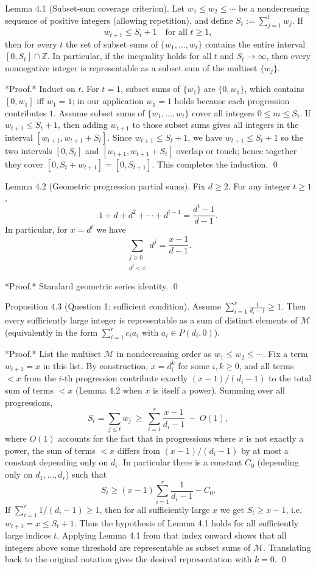 Lemma 4.1 (Subset-sum coverage criterion).
Let $w_1\le w_2\le\cdots$ be a nondecreasing sequence of positive integers (allowing repetition), and define
$S_t:=\sum_{j=1}^t w_j$.
If
\[
 w_{t+1} \le S_t+1\quad\text{for all }t\ge 1,
\]
then for every $t$ the set of subset sums of $\{w_1,\dots,w_t\}$ contains the entire interval $[0,S_t]\cap\mathbb{Z}$.
In particular, if the inequality holds for all $t$ and $S_t\to\infty$, then every nonnegative integer is representable as a subset sum of the multiset $\{w_j\}$.

*Proof.* Induct on $t$.
For $t=1$, subset sums of $\{w_1\}$ are $\{0,w_1\}$, which contains $[0,w_1]$ iff $w_1=1$; in our application $w_1=1$ holds because each progression contributes $1$.
Assume subset sums of $\{w_1,\dots,w_t\}$ cover all integers $0\le m\le S_t$.
If $w_{t+1}\le S_t+1$, then adding $w_{t+1}$ to those subset sums gives all integers in the interval $[w_{t+1},w_{t+1}+S_t]$.
Since $w_{t+1}\le S_t+1$, we have $w_{t+1}\le S_t+1$ so the two intervals $[0,S_t]$ and $[w_{t+1},w_{t+1}+S_t]$ overlap or touch; hence together they cover $[0,S_t+w_{t+1}] = [0,S_{t+1}]$.
This completes the induction. \qed

Lemma 4.2 (Geometric progression partial sums).
Fix $d\ge 2$. For any integer $t\ge 1$,
\[
1+d+d^2+\cdots+d^{t-1} = \frac{d^t-1}{d-1}.
\]
In particular, for $x=d^t$ we have
\[
\sum_{\substack{j\ge 0\\ d^j<x}} d^j = \frac{x-1}{d-1}.
\]

*Proof.* Standard geometric series identity. \qed

Proposition 4.3 (Question 1: sufficient condition).
Assume $\sum_{i=1}^r \frac{1}{d_i-1}\ge 1$.
Then every sufficiently large integer is representable as a sum of distinct elements of $\mathcal{M}$ (equivalently in the form $\sum_{i=1}^r c_i a_i$ with $a_i\in P(d_i,0)$).

*Proof.* List the multiset $\mathcal{M}$ in nondecreasing order as $w_1\le w_2\le\cdots$.
Fix a term $w_{t+1}=x$ in this list. By construction, $x=d_i^k$ for some $i,k\ge 0$, and all terms $<x$ from the $i$-th progression contribute exactly
$(x-1)/(d_i-1)$ to the total sum of terms $<x$ (Lemma 4.2 when $x$ is itself a power).
Summing over all progressions,
\[
S_t = \sum_{j\le t} w_j \ \ge\ \sum_{i=1}^r \frac{x-1}{d_i-1} \ -\ O(1),
\]
where $O(1)$ accounts for the fact that in progressions where $x$ is not exactly a power, the sum of terms $<x$ differs from $(x-1)/(d_i-1)$ by at most a constant depending only on $d_i$.
In particular there is a constant $C_0$ (depending only on $d_1,\dots,d_r$) such that
\[
S_t \ge (x-1)\sum_{i=1}^r \frac{1}{d_i-1} - C_0.
\]
If $\sum_{i=1}^r 1/(d_i-1)\ge 1$, then for all sufficiently large $x$ we get $S_t\ge x-1$, i.e.
$w_{t+1}=x\le S_t+1$.
Thus the hypothesis of Lemma 4.1 holds for all sufficiently large indices $t$.
Applying Lemma 4.1 from that index onward shows that all integers above some threshold are representable as subset sums of $\mathcal{M}$.
Translating back to the original notation gives the desired representation with $k=0$. \qed

